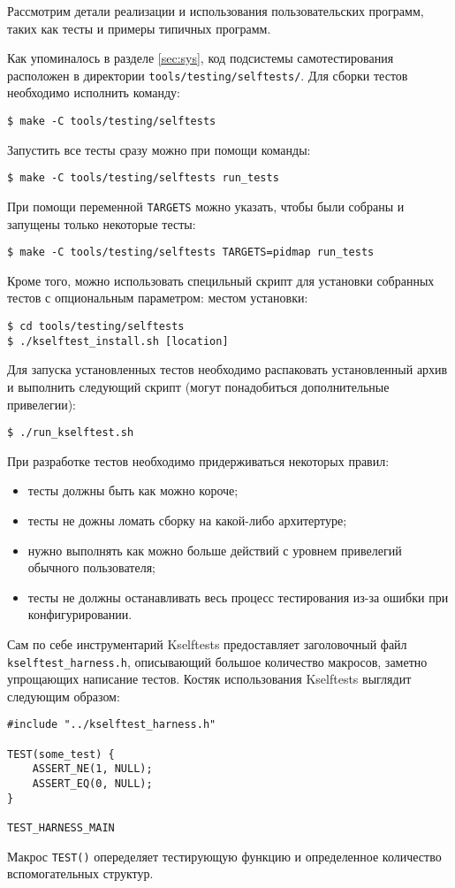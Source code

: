 Рассмотрим детали реализации и использования пользовательских программ, таких
как тесты и примеры типичных программ.

Как упоминалось в разделе \ref{sec:sys}, код подсистемы самотестирования
расположен в директории \texttt{tools/testing/selftests/}. Для сборки тестов
необходимо исполнить команду:
\medskip
\begin{lstlisting}[style=cstyle]
$ make -C tools/testing/selftests
\end{lstlisting}
\medskip

Запустить все тесты сразу можно при помощи команды:
\medskip
\begin{lstlisting}[style=cstyle]
$ make -C tools/testing/selftests run_tests
\end{lstlisting}
\medskip

При помощи переменной \texttt{TARGETS} можно указать, чтобы были собраны и
запущены только некоторые тесты:
\medskip
\begin{lstlisting}[style=cstyle]
$ make -C tools/testing/selftests TARGETS=pidmap run_tests
\end{lstlisting}
\medskip

Кроме того, можно использовать специльный скрипт для установки собранных тестов
с опциональным параметром: местом установки:
\medskip
\begin{lstlisting}[style=cstyle]
$ cd tools/testing/selftests
$ ./kselftest_install.sh [location]
\end{lstlisting}
\medskip

Для запуска установленных тестов необходимо распаковать установленный архив и
выполнить следующий скрипт (могут понадобиться дополнительные привелегии):
\medskip
\begin{lstlisting}[style=cstyle]
$ ./run_kselftest.sh
\end{lstlisting}
\medskip

При разработке тестов необходимо придерживаться некоторых правил:
\begin{itemize}
\item тесты должны быть как можно короче;
\item тесты не дожны ломать сборку на какой-либо архитертуре;
\item нужно выполнять как можно больше действий с уровнем привелегий обычного
  пользователя;
\item тесты не должны останавливать весь процесс тестирования из-за ошибки при
  конфигурировании.
\end{itemize}

Сам по себе инструментарий Kselftests предоставляет заголовочный файл
\texttt{kselftest\_harness.h}, описывающий большое количество макросов, заметно
упрощающих написание тестов. Костяк использования Kselftests выглядит следующим
образом:
\medskip
\begin{lstlisting}[style=cstyle]
#include "../kselftest_harness.h"

TEST(some_test) {
	ASSERT_NE(1, NULL);
	ASSERT_EQ(0, NULL);
}

TEST_HARNESS_MAIN
\end{lstlisting}
\medskip

Макрос \texttt{TEST()} опеределяет тестирующую функцию и определенное количество
вспомогательных структур.
